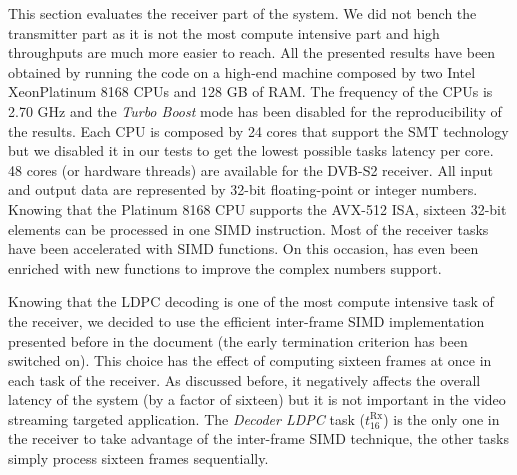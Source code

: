 This section evaluates the receiver part of the system. We did not bench
the transmitter part as it is not the most compute intensive part and high
throughputs are much more easier to reach. All the presented results have been
obtained by running the code on a high-end machine composed by two Intel\R
Xeon\TM Platinum 8168 CPUs and 128 GB of RAM. The frequency of the CPUs is 2.70
GHz and the \emph{Turbo Boost} mode has been disabled for the reproducibility of
the results. Each CPU is composed by 24 cores that support the SMT technology
but we disabled it in our tests to get the lowest possible tasks latency per
core. 48 cores (or hardware threads) are available for the DVB-S2 receiver. All
input and output data are represented by 32-bit floating-point or integer
numbers. Knowing that the Platinum 8168 CPU supports the AVX-512 ISA, sixteen
32-bit elements can be processed in one SIMD instruction. Most of the receiver
tasks have been accelerated with \MIPP SIMD functions. On this occasion, \MIPP
has even been enriched with new functions to improve the complex numbers
support.

Knowing that the LDPC decoding is one of the most compute intensive task of the
receiver, we decided to use the efficient inter-frame SIMD implementation
presented before in the document (the early termination criterion has been
switched on). This choice has the effect of computing sixteen frames at once in
each task of the receiver. As discussed before, it negatively affects the
overall latency of the system (by a factor of sixteen) but it is not important
in the video streaming targeted application. The \emph{Decoder LDPC} task
($t^\text{Rx}_{16}$) is the only one in the receiver to take advantage of the
inter-frame SIMD technique, the other tasks simply process sixteen frames
sequentially.

